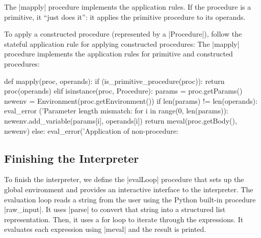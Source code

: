 The \pycode|mapply| procedure implements the application rules.  If the procedure is a primitive, it ``just does it'': it applies the primitive procedure to its operands.

To apply a constructed procedure (represented by a \pycode|Procedure|), follow the stateful application rule for applying constructed procedures: 
The \pycode|mapply| procedure implements the application rules for primitive and constructed procedures:
\begin{pythoncode}
def mapply(proc, operands):
    if (is_primitive_procedure(proc)): return proc(operands)
    elif isinstance(proc, Procedure):
        params = proc.getParams()
        newenv = Environment(proc.getEnvironment())
        if len(params) != len(operands):
            eval_error ('Parameter length mismatch: %
        for i in range(0, len(params)):
            newenv.add_variable(params[i], operands[i])        
        return meval(proc.getBody(), newenv)        
    else: eval_error('Application of non-procedure: %
\end{pythoncode}

\subsection{Finishing the Interpreter}

To finish the interpreter, we define the \pycode|evalLoop| procedure that sets up the global environment and provides an interactive interface to the interpreter.  The evaluation loop reads a string from the user using the Python built-in procedure \pycode|raw_input|.  It uses \pycode|parse| to convert that string into a structured list representation.  Then, it uses a for loop to iterate through the expressions.  It evaluates each expression using \pycode|meval| and the result is printed.  

